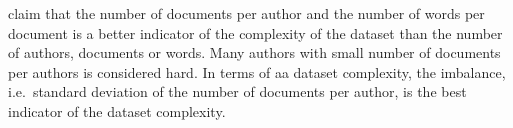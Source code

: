 \citet{tyo_state_2022} claim that the number of documents per author and the number of words per document is 
a better indicator of the complexity of the dataset than the number of authors, documents or words.
Many authors with small number of documents per authors is considered hard.
In terms of \ac{aa} dataset complexity, the imbalance, i.e.\ standard deviation of the number of documents per author, 
is the best indicator of the dataset complexity.
